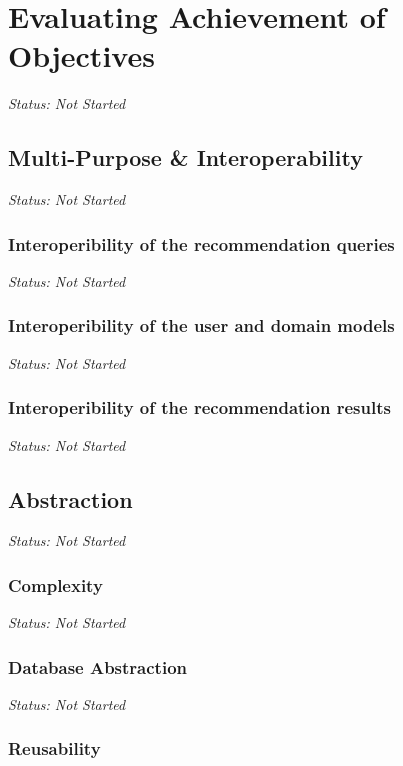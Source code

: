 \chapter{Evaluating Achievement of Objectives}

\emph{Status: Not Started}

\section{Multi-Purpose \& Interoperability}

\emph{Status: Not Started}

\subsection{Interoperibility of the recommendation queries}

\emph{Status: Not Started}

\subsection{Interoperibility of the user and domain models}

\emph{Status: Not Started}

\subsection{Interoperibility of the recommendation results}

\emph{Status: Not Started}

\section{Abstraction}

\emph{Status: Not Started}

\subsection{Complexity}

\emph{Status: Not Started}

\subsection{Database Abstraction}

\emph{Status: Not Started}

\subsection{Reusability}

